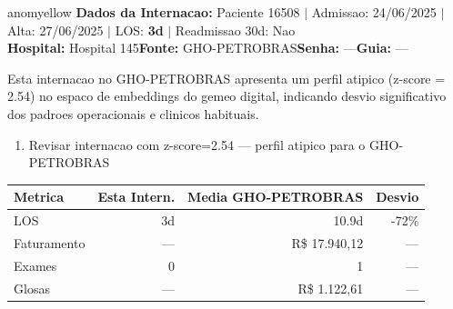 \documentclass[a4paper,10pt]{article}
\begin{document}
\begin{anomalycard}[Internacao 137264 | GHO-PETROBRAS | MODERADO (z=2.54)]{anomyellow}
\textbf{Dados da Internacao:} Paciente 16508 $\mid$ Admissao: 24/06/2025 $\mid$ Alta: 27/06/2025 $\mid$ LOS: \textbf{3d} $\mid$ Readmissao 30d: Nao\\
\textbf{Hospital:} Hospital 145\quad\textbf{Fonte:} GHO-PETROBRAS\quad\textbf{Senha:} ---\quad\textbf{Guia:} ---\\
\vspace{2pt}\begin{tcolorbox}[colback=severityred!20,colframe=anomyellow,title={\textbf{Interpretacao de Negocio}},fonttitle=\bfseries\small,left=4pt,right=4pt,top=3pt,bottom=3pt]
{\small Esta internacao no GHO-PETROBRAS apresenta um perfil atipico (z-score = 2.54) no espaco de embeddings do gemeo digital, indicando desvio significativo dos padroes operacionais e clinicos habituais.}
\end{tcolorbox}
\begin{tcolorbox}[colback=severityyellow!30,colframe=anomorange,title={\textbf{Recomendacoes Especificas}},fonttitle=\bfseries\small,left=4pt,right=4pt,top=3pt,bottom=3pt]
\begin{enumerate}[nosep,leftmargin=16pt]
\item {\small Revisar internacao com z-score=2.54 --- perfil atipico para o GHO-PETROBRAS}
\end{enumerate}
\end{tcolorbox}
\begin{center}\begin{tabular}{l r r r}\toprule\textbf{Metrica} & \textbf{Esta Intern.} & \textbf{Media GHO-PETROBRAS} & \textbf{Desvio} \\\midrule
LOS & 3d & 10.9d & -72\% \\
Faturamento & --- & R\$ 17.940,12 & --- \\
Exames & 0 & 1 & --- \\
Glosas & --- & R\$ 1.122,61 & --- \\
\bottomrule\end{tabular}\end{center}


\end{anomalycard}
\end{document}
